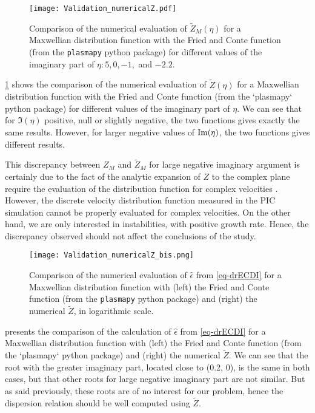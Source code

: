  \begin{figure}[!hbt]
    \centering
    \texttt{[image: Validation\_numericalZ.pdf]}
    \caption{Comparison of the numerical evaluation of $\tilde{Z}_M(\eta)$ for a Maxwellian distribution function with the Fried and Conte function (from the \texttt{plasmapy} python package) for different values of the imaginary part of $\eta: 5, 0,-1,$ and $-2.2$.  }
    \label{fig-numZ}
  \end{figure}
  \cref{fig-numZ} shows the comparison of the numerical evaluation of $\tilde{Z}(\eta)$ for a Maxwellian distribution function with the Fried and Conte function (from the `plasmapy` python package) for different values of the imaginary part of $\eta$.
  We can see that for $\Im(\eta)$ positive, null or slightly negative, the two functions gives exactly the same results.
  However, for larger negative values of ${\rm Im}(\eta)$, the two functions gives different results.
  
  This discrepancy between $Z_M$ and $\tilde{Z}_M$ for large negative imaginary argument is certainly due to the fact of the analytic expansion of $Z$ to the complex plane require the evaluation of the distribution function for complex velocities \citep{xie2013,weideman1995}.
  However, the discrete velocity distribution function measured in the \ac{PIC} simulation cannot be properly evaluated for complex velocities.
  On the other hand, we are only interested in instabilities, with positive growth rate.
  Hence, the discrepancy observed should not affect the conclusions of the study.
  


  \begin{figure}[hbt]
    \centering
    \texttt{[image: Validation\_numericalZ\_bis.png]}
    \caption{Comparison of the numerical evaluation of $\hat\epsilon$ from \cref{eq-drECDI} for a Maxwellian distribution function with (left) the Fried and Conte function (from the \texttt{plasmapy} python package) and (right) the numerical $\tilde{Z}$, in logarithmic scale.  }
    \label{fig-numZbis}
  \end{figure}
  
   presents the comparison of the calculation of $\hat\epsilon$ from \cref{eq-drECDI} for a Maxwellian distribution function with (left) the Fried and Conte function (from the `plasmapy` python package) and (right) the numerical $\tilde{Z}$.
  We can see that the root with the greater imaginary part, located close to (0.2, 0), is the same in both cases, but that other roots for large negative imaginary part are not similar.
  But as said previously, these roots are of no interest for our problem, hence the dispersion relation should be well computed using $\tilde{Z}$.
  

